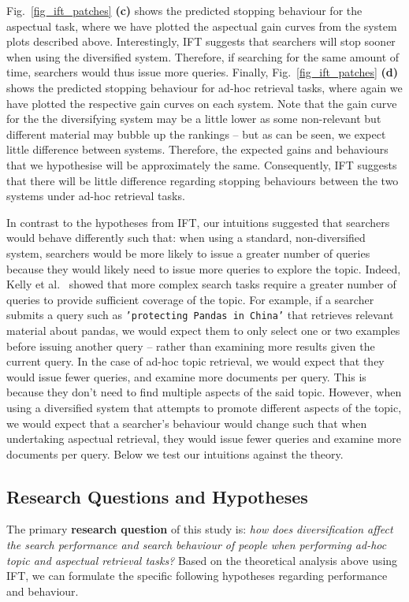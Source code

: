 Fig.~\ref{fig_ift_patches} \textbf{(c)} shows the predicted stopping behaviour for the aspectual task, where we have plotted the aspectual gain curves from the system plots described above. Interestingly, IFT suggests that searchers will stop sooner when using the diversified system. Therefore, if searching for the same amount of time, searchers would thus issue more queries. Finally, Fig.~\ref{fig_ift_patches} \textbf{(d)} shows the predicted stopping behaviour for ad-hoc retrieval tasks, where again we have plotted the respective gain curves on each system. Note that the gain curve for the the diversifying system may be a little lower as some non-relevant but different material may bubble up the rankings -- but as can be seen, we expect little difference between systems. Therefore, the expected gains and behaviours that we hypothesise will be approximately the same. Consequently, IFT suggests that there will be little difference regarding stopping behaviours between the two systems under ad-hoc retrieval tasks.

In contrast to the hypotheses from IFT, our intuitions suggested that searchers would behave differently such that: when using a standard, non-diversified system, searchers would be more likely to issue a greater number of queries because they would likely need to issue more queries to explore the topic. Indeed, Kelly et al.~\cite{kelly2015search_tasks} showed that more complex search tasks require a greater number of queries to provide sufficient coverage of the topic. For example, if a searcher submits a query such as \texttt{'protecting Pandas in China'} that retrieves relevant material about pandas, we would expect them to only select one or two examples before issuing another query -- rather than examining more results given the current query. In the case of ad-hoc topic retrieval, we would expect that they would issue fewer queries, and examine more documents per query. This is because they don't need to find multiple aspects of the said topic. However, when using a diversified system that attempts to promote different aspects of the topic, we would expect that a searcher's behaviour would change such that when undertaking aspectual retrieval, they would issue fewer queries and examine more documents per query. Below we test our intuitions against the theory.

\subsection{Research Questions and Hypotheses} \label{sec:questions}
The primary \textbf{research question} of this study is: {\it how does diversification affect the search performance and search behaviour of people when performing ad-hoc topic and aspectual retrieval tasks?} Based on the theoretical analysis above using IFT, we can formulate the specific following hypotheses regarding performance and behaviour.

